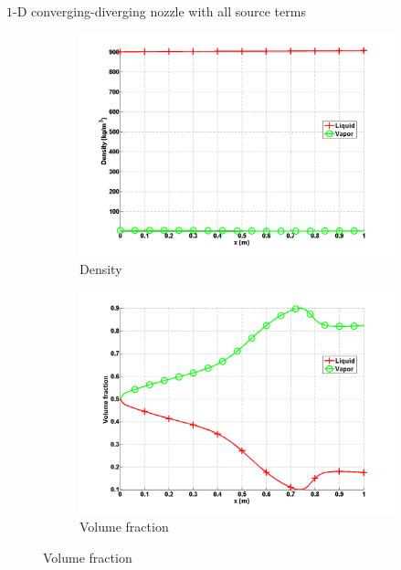 \documentclass[xcolor=dvipsnames,10pt]{beamer}
\begin{document}
\begin{frame}{$1$-D converging-diverging nozzle with all source terms}
\begin{figure}[H]
\begin{subfigure}[b]{0.37\textwidth}
\centering
\includegraphics[width=\textwidth]{../figures/SEM/Aint1e3MassOn_two_phases_density.png}
\caption{Density}
\end{subfigure}
%
\begin{subfigure}[b]{0.37\textwidth}
\centering
\includegraphics[width=\textwidth]{../figures/SEM/Aint1e3MassOn_two_phases_volume_fraction.png}
\caption{Volume fraction}
\end{subfigure}
\end{figure}
\end{frame}
\end{document}
